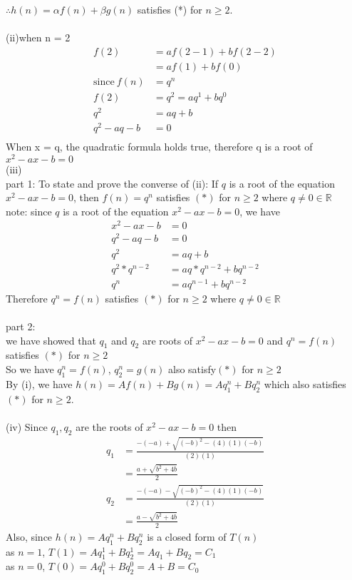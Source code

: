 \documentclass[12pt]{article}
\begin{document}
\indent $\therefore h(n) = \alpha f(n)+\beta g(n) $ satisfies (*) for $n\ge 2$.\\\\

\noindent
(ii)when n = 2
\begin{align*}
    f(2) &= af(2-1) + bf(2-2)\\
    &=af(1) + bf(0)\\
    \text{since} \ f (n) &= q^n\\
    f(2)&= q^2 = aq^1 + bq^0\\
    q^2 &=aq +b\\
    q^2 - aq - b &= 0\\
\end{align*}
When x = q, the quadratic formula holds true, therefore q is a root of $x^2 -ax-b = 0$\\

\newpage
\noindent
(iii)\\
part 1: To state and prove the converse of (ii): If $q$ is a root of the equation $x^2 - ax -b = 0$, then $f(n) = q^n$ satisfies $(*)$ for $n\ge 2$ where $q\neq 0 \in \mathbb{R}$\\
note: since $q$ is a root of the equation $x^2 - ax -b = 0$, we have
\begin{align*}
    x^2 - ax -b &= 0\\
    q^2 - aq - b &= 0\\
    q^2 &= aq +b\\
    q^2*q^{n-2} &= aq * q^{n-2} + bq^{n-2}\\
    q^n &= aq^{n-1} + bq^{n-2}
\end{align*}
Therefore $q^n = f(n)$ satisfies $(*)$ for $n\ge 2$ where $q\neq 0 \in \mathbb{R}$\\\\
part 2: \\
we have showed that $q_1$ and $q_2$ are roots of $x^2 - ax - b = 0$ and $q^n = f(n)$ satisfies $(*)$ for $n\ge 2$\\
So we have $q^n_1 = f(n)$, $q^n_2 = g(n)$ also satisfy$(*)$ for $n\ge 2$\\
By (i), we have $h(n) = Af(n) + Bg(n) = Aq^n_1 + Bq^n_2$ which also satisfies $(*)$ for $n\ge 2$.\\\\

\noindent
(iv) Since $q_1, q_2$ are the roots of $x^2-ax-b=0$ then\\
\begin{align*}
q_1 &= \frac{-(-a)+\sqrt{(-b)^2-(4)(1)(-b)}}{(2)(1)}\\
&=\frac{a+\sqrt{b^2+4b}}{2}\\
q_2 &= \frac{-(-a)-\sqrt{(-b)^2-(4)(1)(-b)}}{(2)(1)}\\
&=\frac{a-\sqrt{b^2+4b}}{2}
\end{align*}
Also, since $h(n)=Aq_1^n+Bq_2^n$ is a closed form of $T(n)$\\
as $n=1$, $T(1)=Aq_1^1+Bq_2^1 = Aq_1+Bq_2 = C_1$\\
as $n=0$, $T(0)=Aq_1^0+Bq_2^0 = A+B = C_0$\\\\
\end{document}
